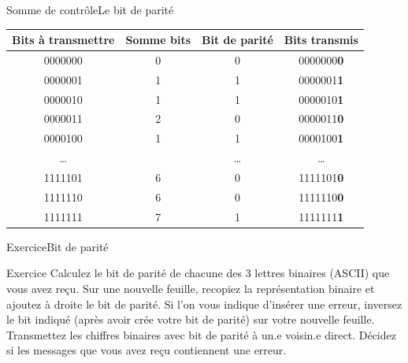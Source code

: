 \documentclass{beamer}
\begin{document}
\begin{frame}{Somme de contrôle}{Le bit de parité}
	\begin{table}
		\begin{tabular}{|c|c|c|c|}
			\hline
			Bits à transmettre & Somme bits & Bit de parité & Bits transmis     \\ \hline
			0000000            & 0          & 0             & 0000000\textbf{0} \\ \hline
			0000001            & 1          & 1             & 0000001\textbf{1} \\ \hline
			0000010            & 1          & 1             & 0000010\textbf{1} \\ \hline
			0000011            & 2          & 0             & 0000011\textbf{0} \\ \hline
			0000100            & 1          & 1             & 0000100\textbf{1} \\ \hline
			…                  & ~          & …             & …                 \\ \hline
			1111101            & 6          & 0             & 1111101\textbf{0} \\ \hline
			1111110            & 6          & 0             & 1111110\textbf{0} \\ \hline
			1111111            & 7          & 1             & 1111111\textbf{1} \\ \hline
		\end{tabular}
	\end{table}
\end{frame}

\begin{frame}{Exercice}{Bit de parité}
	\begin{alertblock}{Exercice}
		Calculez le bit de parité de chacune des 3 lettres binaires (ASCII) que vous avez reçu. Sur une nouvelle feuille, recopiez la représentation binaire et ajoutez à droite le bit de parité. Si l’on vous indique d’insérer une erreur, inversez le bit indiqué (après avoir crée votre bit de parité) sur votre nouvelle feuille. Transmettez les chiffres binaires avec bit de parité à un.e voisin.e direct. Décidez si les messages que vous avez reçu contiennent une erreur.
	\end{alertblock}
\end{frame}
\end{document}
